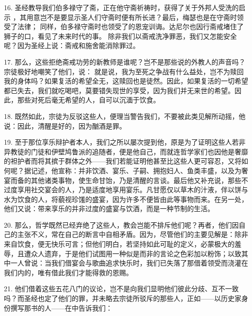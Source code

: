 16. 圣经教导我们伯多禄守了斋，正在他守斋祈祷时，获得了关于外邦人受洗的启示 ，其用意岂不是要显示圣人们守斋时便有所长进？最后，梅瑟也是在守斋时领受了法律； 同样，伯多禄守斋时也领受了的恩宠训诲。达尼尔也因行斋戒堵住了狮子的口，看见了未来时代的事。 除非我们以斋戒洗净罪恶，我们又怎能安全呢？因为圣经上说：斋戒和施舍能消除罪过。\par

17. 那么，这些拒绝斋戒功劳的新教师是谁呢？岂不是那些说的外教人的声音吗？宗徒极好地嘲笑了他们，说：  就是说，我为至死之争战有什么益处，岂不为赎回我的身体吗？如果复活的希望全无，这赎回也是徒然。因此，如果复活的一切希望都已失去，我们就吃喝吧，莫要错失现世的享受，因为我们并无来世的希望。因此，那些对死后毫无希望的人，自可以沉湎于饮食。\par

18. 既然如此，宗徒为反驳这些人，便理当警告我们，不要被此类见解所动摇，他说：因此，清醒是好的，因为酗酒是罪。\par

19. 至于那位享乐辩护者本人，我们之所以屡次提到他，原是为了证明这些人若非异教徒的门徒和伊壁鸠鲁派的追随者，便是他自己，而就连哲学家们也因他是奢靡的袒护者而将其摈于群体之外——我们若能证明他甚至比这些人更可容忍，又将如何呢？据记述，他宣称：并非饮酒、宴乐、子嗣、拥抱妇人、鱼类丰盛，以及为奢宴而备的其他诸类事物，使生命甘饴，乃是清醒的言谈。最后他又补充说，那些不过度享用社交宴会的人，乃是适度地享用宴乐。凡甘愿仅以草木的汁液，伴以饼与水为饮食的人，将藐视珍馐的盛宴，因为许多不便皆由此等事物而来。在另一处，他们又说：带来享乐的并非过度的盛宴与饮酒，而是一种节制的生活。\par

20. 那么，哲学既然已经弃绝了这些人，教会岂能不排斥他们呢？再者，他们因自己的主张不义，常在自己的断言中自相矛盾。因为，尽管他们的主要见解是：除非来自饮食，便无快乐可言；但他们明白，若坚持如此可耻的定义，必蒙极大的羞辱，且遭众人遗弃，于是他们试图用一种似是而非的言论之色彩加以粉饰；以致其中一人曾说：当我们借宴会与歌曲追求快乐时，我们已失落了那借着领受而浇灌在我们内的，唯有借此我们才能得救的恩赐。\par

21. 他们借着这些五花八门的议论，岂不是向我们显明他们彼此分歧、互不一致吗？而圣经也定了他们的罪，并未略去宗徒所驳斥的那些人，正如——以历史家身份撰写那书的人——在中告诉我们：\par

